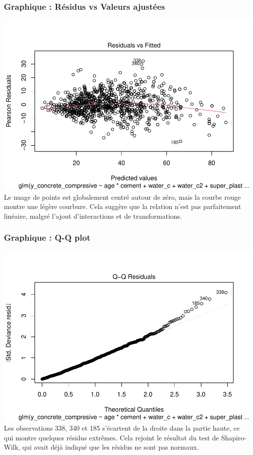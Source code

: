 \documentclass[
  12pt,
]{article}
\begin{document}
\subsubsection{Graphique : Résidus vs Valeurs
ajustées}\label{graphique-ruxe9sidus-vs-valeurs-ajustuxe9es}

\includegraphics{rmd_final_files/figure-latex/unnamed-chunk-60-1.pdf} Le
nuage de points est globalement centré autour de zéro, mais la courbe
rouge montre une légère courbure. Cela suggère que la relation n'est pas
parfaitement linéaire, malgré l'ajout d'interactions et de
transformations.

\subsubsection{Graphique : Q-Q plot}\label{graphique-q-q-plot}

\includegraphics{rmd_final_files/figure-latex/unnamed-chunk-61-1.pdf}
Les observations 338, 340 et 185 s'écartent de la droite dans la partie
haute, ce qui montre quelques résidus extrêmes. Cela rejoint le résultat
du test de Shapiro-Wilk, qui avait déjà indiqué que les résidus ne sont
pas normaux.
\end{document}
